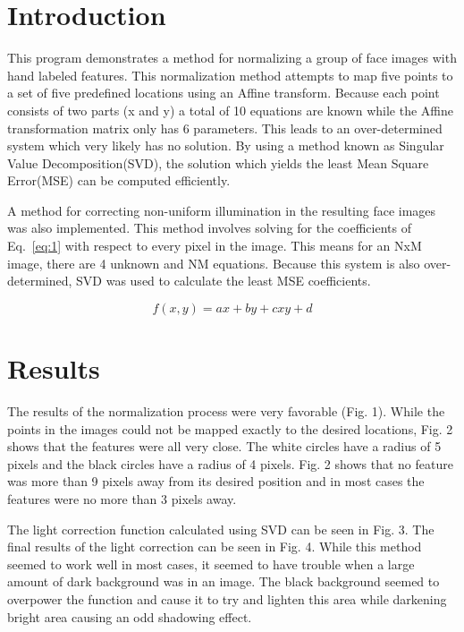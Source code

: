 \section{Introduction}

  This program demonstrates a method for normalizing a group of face images with hand labeled
features.  This normalization method attempts to map five points to a set of five predefined locations using an Affine transform.  Because each point consists of two parts (x and y) a total of 10 equations are known while the Affine transformation matrix only has 6 parameters.  This leads to an over-determined system which very likely has no solution.  By using a method known as Singular Value Decomposition(SVD), the solution which yields the least Mean Square Error(MSE) can be computed efficiently.

A method for correcting non-uniform illumination in the resulting face images was also implemented.  This method involves solving for the coefficients of Eq.~\ref{eq:1} with respect to every pixel in the image.  This means for an NxM image, there are 4 unknown and NM equations.  Because this system is also over-determined, SVD was used to calculate the least MSE coefficients. 

\begin{equation}
  \label{eq:1}
  f(x,y)=ax+by+cxy+d
\end{equation}

\section{Results}
  
  The results of the normalization process were very favorable (Fig. 1). While the points in the images could not be mapped exactly to the desired locations, Fig. 2 shows that the features were all very close.  The white circles have a radius of 5 pixels and the black circles have a radius of 4 pixels.  Fig. 2 shows that no feature was more than 9 pixels away from its desired position and in most cases the features were no more than 3 pixels away.

  The light correction function calculated using SVD can be seen in Fig. 3.  The final results of the light correction can be seen in Fig. 4.  While this method seemed to work well in most cases, it seemed to have trouble when a large amount of dark background was in an image.  The black background seemed to overpower the function and cause it to try and lighten this area while darkening bright area causing an odd shadowing effect.

